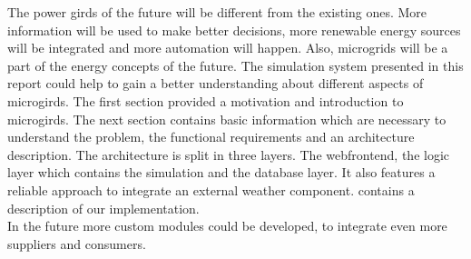The power girds of the future will be different from the existing ones. More information will be used to make better decisions, more renewable energy sources will be integrated and more automation will happen. Also, microgrids will be a part of the energy concepts of the future. The simulation system presented in this report could help to gain a better understanding about different aspects of microgirds. The first section provided a motivation and introduction to microgirds. The next section contains basic information which are necessary to understand the problem, the functional requirements and an architecture description. The architecture is split in three layers. The webfrontend, the logic layer which contains the simulation and the database layer. It also features a reliable approach to integrate an external weather component.  contains a description of our implementation.\\

\noindent In the future more custom modules could be developed, to integrate even more suppliers and consumers.
